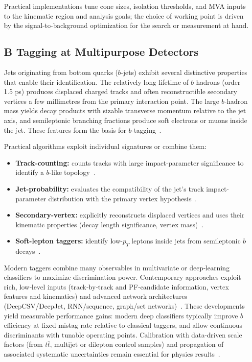 Practical implementations tune cone sizes, isolation thresholds, and MVA inputs to the kinematic region and analysis goals; the choice of working point is driven by the signal-to-background optimization for the search or measurement at hand.


\subsection{B Tagging at Multipurpose Detectors}

Jets originating from bottom quarks ($b$-jets) exhibit several distinctive properties that enable their identification. The relatively long lifetime of $b$ hadrons (order 1.5 ps) produces displaced charged tracks and often reconstructible secondary vertices a few millimetres from the primary interaction point. The large $b$-hadron mass yields decay products with sizable transverse momentum relative to the jet axis, and semileptonic branching fractions produce soft electrons or muons inside the jet. These features form the basis for $b$-tagging~\cite{CMS_BTV2016}.

Practical algorithms exploit individual signatures or combine them:
\begin{itemize}
  \item \textbf{Track-counting:} counts tracks with large impact-parameter significance to identify a $b$-like topology~\cite{CMS_BTV2016}.
  \item \textbf{Jet-probability:} evaluates the compatibility of the jet's track impact-parameter distribution with the primary vertex hypothesis~\cite{CMS_BTV2016}.
  \item \textbf{Secondary-vertex:} explicitly reconstructs displaced vertices and uses their kinematic properties (decay length significance, vertex mass)~\cite{CMS_BTV2016}.
  \item \textbf{Soft-lepton taggers:} identify low-$p_T$ leptons inside jets from semileptonic $b$ decays~\cite{CMS_BTV2016}.
\end{itemize}

Modern taggers combine many observables in multivariate or deep‑learning classifiers to maximize discrimination power. Contemporary approaches exploit rich, low‑level inputs (track‑by‑track and PF‑candidate information, vertex features and kinematics) and advanced network architectures (DeepCSV/DeepJet, RNN/sequence, graph/set networks)~\cite{CMS_BTV2016,Bols_2020,ATLAS:2022fgo}. These developments yield measurable performance gains: modern deep classifiers typically improve $b$ efficiency at fixed mistag rate relative to classical taggers, and allow continuous discriminants with tunable operating points. Calibration with data-driven scale factors (from $t\bar t$, multijet or dilepton control samples) and propagation of associated systematic uncertainties remain essential for physics results~\cite{CMS_BTV2016}.


